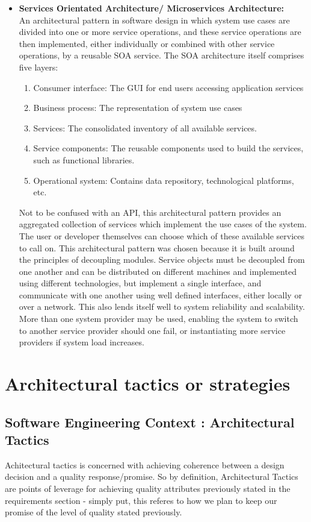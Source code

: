 \documentclass[a4paper,10pt]{article}
\begin{document}
\begin{itemize}
		\item \textbf{Services Orientated Architecture/ Microservices Architecture:}\\
		An architectural pattern in software design in which system use cases are divided into one or more service operations, and these service operations are then implemented, either individually or combined with other service operations, by a reusable SOA service. The SOA architecture itself comprises five layers:
		\begin{enumerate}
			\item Consumer interface: The GUI for end users accessing application services
			\item Business process: The representation of system use cases
			\item Services: The consolidated inventory of all available services.
			\item Service components: The reusable components used to build the services, such as functional libraries.
			\item Operational system: Contains data repository, technological platforms, etc.
		\end{enumerate}
		Not to be confused with an API, this architectural pattern provides an aggregated collection of services which implement the use cases of the system. The user or developer themselves can choose which of these available services to call on. This architectural pattern was chosen because it is built around the principles of decoupling modules. Service objects must be decoupled from one another and can be distributed on different machines and implemented using different technologies, but implement a single interface, and communicate with one another using well defined interfaces, either locally or over a network. This also lends itself well to system reliability and scalability. More than one system provider may be used, enabling the system to switch to another service provider should one fail, or instantiating more service providers if system load increases.
	\end{itemize}

\section{Architectural tactics or strategies}
\subsection{Software Engineering Context : Architectural Tactics}
Achitectural tactics is concerned with achieving coherence between  a design decision and a quality response/promise. So by definition, Architectural Tactics are points of leverage for achieving quality attributes previously stated in the requirements section - simply put, this referes to how we plan to keep our promise of the level of quality stated previously. 
\end{document}
